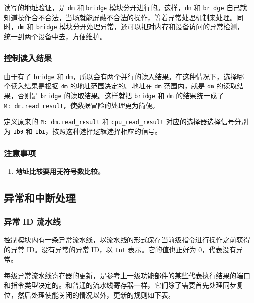 \documentclass[12pt,AutoFakeBold,AutoFakeSlant]{article}
\providecommand{\tightlist}{%
  \setlength{\itemsep}{0pt}\setlength{\parskip}{0pt}}
\newcommand{\ms}[1]{\texttt{#1}}
\begin{document}
读写的地址验证，是 \ms{dm} 和 \ms{bridge} 模块分开进行的。这样，\ms{dm} 和 \ms{bridge} 自己就知道操作合不合法，当场就能屏蔽不合法的操作，等着异常处理机制来处理。同时，\ms{dm} 和 \ms{bridge} 模块分开处理异常，还可以把对内存和设备访问的异常检测，统一到两个设备中去，方便维护。

\hypertarget{ux63a7ux5236ux8bfbux5165ux7ed3ux679c}{%
\subsubsection{控制读入结果}\label{ux63a7ux5236ux8bfbux5165ux7ed3ux679c}}

由于有了 \texttt{bridge} 和 \texttt{dm}，所以会有两个并行的读入结果。在这种情况下，选择哪个读入结果是根据 \ms{dm} 的地址范围决定的。地址在 \ms{dm} 范围内，就是 \ms{dm} 的读取结果，否则是 \ms{bridge} 的读取结果。这样就把 \texttt{bridge} 和 \texttt{dm} 的结果统一成了 \texttt{M:\ dm.read\_result}，使数据冒险的处理更为简便。 

定义原来的 \texttt{M:\ dm.read\_result} 和 \texttt{cpu\_read\_result} 对应的选择器选择信号分别为 \texttt{1\textquotesingle{}b0} 和 \texttt{1\textquotesingle{}b1}，按照这种选择逻辑选择相应的信号。 

\subsubsection{注意事项}

\begin{enumerate}
\tightlist
\item
\textbf{地址比较要用无符号数比较。}
\end{enumerate}

\hypertarget{ux5f02ux5e38ux548cux4e2dux65adux5904ux7406}{%
\subsection{异常和中断处理}\label{ux5f02ux5e38ux548cux4e2dux65adux5904ux7406}}

\subsubsection{异常 ID 流水线}

控制模块内有一条异常流水线，以流水线的形式保存当前级指令进行操作之前获得的异常 ID。没有异常的异常 ID，以 \ms{Int} 表示。它的值也正好为 0，代表没有异常。

每级异常流水线寄存器的更新，是参考上一级功能部件的某些代表执行结果的端口和指令类型决定的。和普通的流水线寄存器一样，它们除了需要首先处理同步复位，然后处理使能关闭的情况以外，更新的规则如下表。
\end{document}
